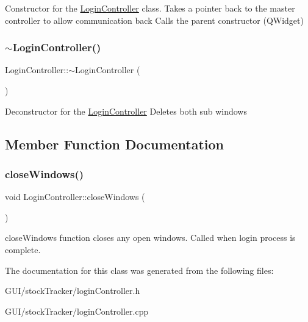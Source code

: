 Constructor for the \mbox{\hyperlink{class_login_controller}{Login\+Controller}} class. Takes a pointer back to the master controller to allow communication back Calls the parent constructor (Q\+Widget) \mbox{\label{class_login_controller_ab1dfb02e0f9f71d7d7c8d225a8cad568}} 
\subsubsection{\texorpdfstring{$\sim$\+Login\+Controller()}{~LoginController()}}
{\footnotesize\ttfamily Login\+Controller\+::$\sim$\+Login\+Controller (\begin{DoxyParamCaption}{ }\end{DoxyParamCaption})}

Deconstructor for the \mbox{\hyperlink{class_login_controller}{Login\+Controller}} Deletes both sub windows 

\subsection{Member Function Documentation}
\mbox{\label{class_login_controller_a358f161325a516457b19cbd610805b7a}} 
\subsubsection{\texorpdfstring{close\+Windows()}{closeWindows()}}
{\footnotesize\ttfamily void Login\+Controller\+::close\+Windows (\begin{DoxyParamCaption}{ }\end{DoxyParamCaption})}

close\+Windows function closes any open windows. Called when login process is complete. 

The documentation for this class was generated from the following files\+:\begin{DoxyCompactItemize}
\item 
G\+U\+I/stock\+Tracker/login\+Controller.\+h\item 
G\+U\+I/stock\+Tracker/login\+Controller.\+cpp\end{DoxyCompactItemize}
